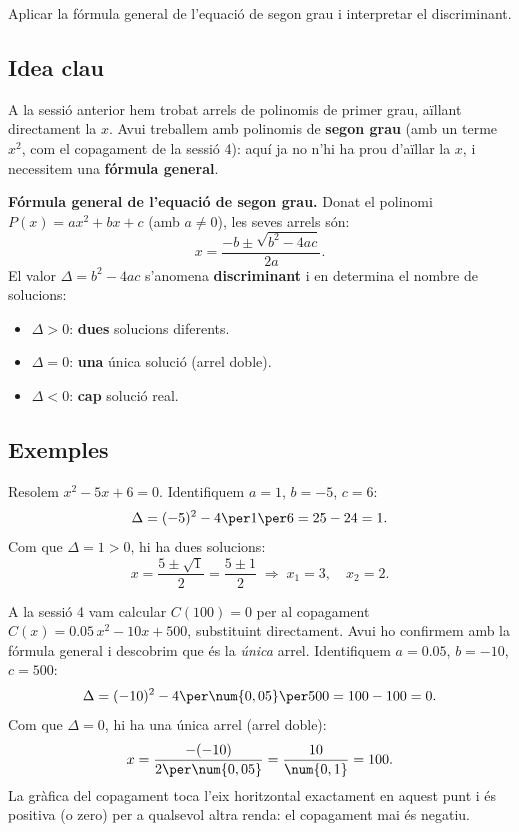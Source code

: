 %
{Aplicar la fórmula general de l'equació de segon grau i interpretar el discriminant.}

\subsection{Idea clau}

A la sessió anterior hem trobat arrels de polinomis de primer grau, aïllant
directament la $x$. Avui treballem amb polinomis de \textbf{segon grau} (amb un
terme $x^2$, com el copagament de la sessió 4): aquí ja no n'hi ha prou
d'aïllar la $x$, i necessitem una \textbf{fórmula general}.

\begin{idea}
\textbf{Fórmula general de l'equació de segon grau.}
Donat el polinomi $P(x)=ax^2+bx+c$ (amb $a\neq 0$), les seves arrels són:
\[
x=\frac{-b\pm\sqrt{b^2-4ac}}{2a}.
\]
El valor $\Delta=b^2-4ac$ s'anomena \textbf{discriminant} i en determina el
nombre de solucions:
\begin{itemize}[leftmargin=1.4em, itemsep=2pt]
  \item $\Delta>0$: \textbf{dues} solucions diferents.
  \item $\Delta=0$: \textbf{una} única solució (arrel doble).
  \item $\Delta<0$: \textbf{cap} solució real.
\end{itemize}
\end{idea}

\subsection{Exemples}

\begin{exemple}
Resolem $x^2-5x+6=0$. Identifiquem $a=1$, $b=-5$, $c=6$:
\[
\Delta=(-5)^2-4\per1\per6=25-24=1.
\]
Com que $\Delta=1>0$, hi ha dues solucions:
\[
x=\frac{5\pm\sqrt{1}}{2}=\frac{5\pm1}{2} \;\Longrightarrow\; x_1=3,\quad x_2=2.
\]
\end{exemple}

\begin{exemple}
A la sessió 4 vam calcular $C(100)=0$ per al copagament
$C(x)=\num{0,05}\,x^2-10x+500$, substituint directament. Avui ho confirmem
amb la fórmula general i descobrim que és la \emph{única} arrel. Identifiquem
$a=\num{0,05}$, $b=-10$, $c=500$:
\[
\Delta=(-10)^2-4\per\num{0,05}\per500=100-100=0.
\]
Com que $\Delta=0$, hi ha una única arrel (arrel doble):
\[
x=\frac{-(-10)}{2\per\num{0,05}}=\frac{10}{\num{0,1}}=100.
\]
La gràfica del copagament toca l'eix horitzontal exactament en aquest punt i
és positiva (o zero) per a qualsevol altra renda: el copagament mai és
negatiu.
\end{exemple}

